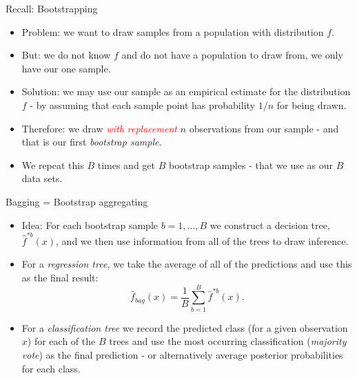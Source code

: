 \documentclass[10pt,ignorenonframetext,]{beamer}
\begin{document}
\begin{frame}

\begin{block}{Recall: Bootstrapping}

\vspace{2mm}

\begin{itemize}
\item
  Problem: we want to draw samples from a population with distribution
  \(f\).
\item
  But: we do not know \(f\) and do not have a population to draw from,
  we only have our one sample.
\item
  Solution: we may use our sample as an empirical estimate for the
  distribution \(f\) - by assuming that each sample point has
  probability \(1/n\) for being drawn.
\item
  Therefore: we draw \emph{\textcolor{red}{with replacement}} \(n\)
  observations from our sample - and that is our first \emph{bootstrap
  sample}.
\item
  We repeat this \(B\) times and get \(B\) bootstrap samples - that we
  use as our \(B\) data sets.
\end{itemize}

\end{block}

\end{frame}

\begin{frame}

\begin{block}{Bagging = Bootstrap aggregating}

\begin{itemize}
\item
  Idea: For each bootstrap sample \(b=1,\ldots, B\) we construct a
  decision tree, \(\hat{f}^{*b}(x)\), and we then use information from
  all of the trees to draw inference.
\item
  For a \emph{regression tree}, we take the average of all of the
  predictions and use this as the final result: \[
  \hat{f}_{bag}(x)=\frac{1}{B}\sum_{b=1}^B \hat{f}^{*b}(x).
  \]
\item
  For a \emph{classification tree} we record the predicted class (for a
  given observation \(x\)) for each of the \(B\) trees and use the most
  occurring classification (\emph{majority vote}) as the final
  prediction - or alternatively average posterior probabilities for each
  class.
\end{itemize}

\end{block}

\end{frame}
\end{document}
